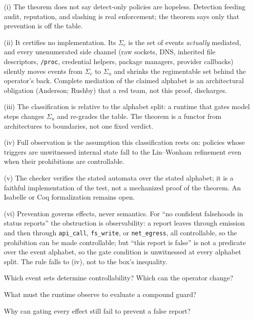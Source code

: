 \documentclass[11pt,a4paper]{article}
\theoremstyle{definition}
\theoremstyle{remark}
\begin{document}
\begin{pdboundary}
\setlength{\parskip}{4pt plus 1pt}
(i) The theorem does not say detect-only policies are hopeless. Detection feeding audit,
reputation, and slashing is real enforcement; the theorem says only that prevention is off
the table.

(ii) It certifies no implementation. Its $\Sigma_c$ is the set of events
\emph{actually} mediated, and every unenumerated side channel (raw sockets, DNS, inherited
file descriptors, \texttt{/proc}, credential helpers, package managers, provider callbacks)
silently moves events from $\Sigma_c$ to $\Sigma_u$ and shrinks the regimentable set behind
the operator's back. Complete mediation of the claimed alphabet is an architectural
obligation (Anderson; Rushby) that a red team, not this proof, discharges.

(iii) The
classification is relative to the alphabet split: a runtime that gates model steps changes
$\Sigma_u$ and re-grades the table. The theorem is a functor from architectures to
boundaries, not one fixed verdict.

(iv) Full observation is the assumption this
classification rests on: policies whose triggers are unwitnessed internal state fall to
the Lin--Wonham refinement even when their prohibitions are controllable.

(v) The checker verifies the stated automata over the stated
alphabet; it is a faithful implementation of the test, not a mechanized proof of the theorem.
An Isabelle or Coq formalization remains open.

(vi) Prevention governs effects, never
semantics. For ``no confident falsehoods in status reports'' the obstruction is
observability: a report leaves through emission and then through \texttt{api\_call},
\texttt{fs\_write}, or \texttt{net\_egress}, all controllable, so the prohibition can be made
controllable; but ``this report is false'' is not a predicate over the event alphabet, so the
gate condition is unwitnessed at every alphabet split. The rule falls to (iv), not to the
box's inequality.
\end{pdboundary}

\begin{pdrecitation}
\item Which event sets determine controllability? Which can the operator change?
\item What must the runtime observe to evaluate a compound guard?
\item Why can gating every effect still fail to prevent a false report?
\end{pdrecitation}
\end{document}
